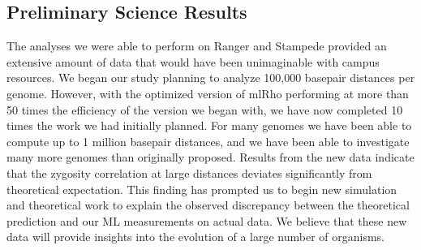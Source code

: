 \documentclass{sig-alternate}
\begin{document}





\subsection{Preliminary Science Results}
The analyses we were able to perform on Ranger and Stampede provided an extensive amount of data that would
have been unimaginable with campus resources. We began our study planning to analyze 100,000
basepair distances per genome. However, with the optimized version of mlRho performing at more than 50
times the efficiency of the version we began with, we have now completed 10 times the work we had initially
planned. For many genomes we have been able to compute up to 1 million basepair distances, and we have been
able to investigate many more genomes than originally proposed. Results from the new data indicate that the
zygosity correlation at large distances deviates significantly from theoretical expectation. This finding has
prompted us to begin new simulation and theoretical work to explain the observed discrepancy between the
theoretical prediction and our ML measurements on actual data. We believe that these new data will provide 
insights into the evolution of a large number of organisms.
\end{document}

